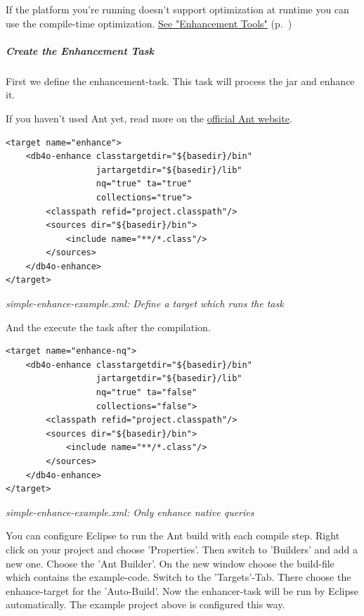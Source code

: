If the platform you're running doesn't support optimization at runtime you can use the compile-time optimization. \hyperref[ref:advanced-topics-enhancement-tools]{See "Enhancement Tools"} (p.~\pageref{ref:advanced-topics-enhancement-tools})

\subparagraph*{Create the Enhancement Task}

First we define the enhancement-task. This task will process the jar and enhance it.

If you haven't used Ant yet, read more on the \href{http://ant.apache.org/}{official Ant website}.

\begin{lstlisting}
<target name="enhance">
    <db4o-enhance classtargetdir="${basedir}/bin"
                  jartargetdir="${basedir}/lib"
                  nq="true" ta="true"
                  collections="true">
        <classpath refid="project.classpath"/>
        <sources dir="${basedir}/bin">
            <include name="**/*.class"/>
        </sources>
    </db4o-enhance>
</target>
\end{lstlisting}

{\small\itshape simple-enhance-example.xml: Define a target which runs the task\par}
\medskip

And the execute the task after the compilation.

\begin{lstlisting}
<target name="enhance-nq">
    <db4o-enhance classtargetdir="${basedir}/bin"
                  jartargetdir="${basedir}/lib"
                  nq="true" ta="false"
                  collections="false">
        <classpath refid="project.classpath"/>
        <sources dir="${basedir}/bin">
            <include name="**/*.class"/>
        </sources>
    </db4o-enhance>
</target>
\end{lstlisting}

{\small\itshape simple-enhance-example.xml: Only enhance native queries\par}
\medskip

You can configure Eclipse to run the Ant build with each compile step. Right click on your project and choose 'Properties'. Then switch to 'Builders' and add a new one. Choose the 'Ant Builder'. On the new window choose the build-file which contains the example-code. Switch to the 'Targets'-Tab. There choose the enhance-target for the 'Auto-Build'. Now the enhancer-task will be run by Eclipse automatically. The example project above is configured this way.

